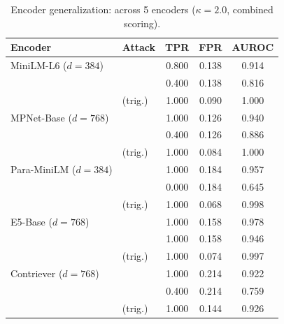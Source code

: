\begin{table}[h]
  \centering
  \small
  \caption{Encoder generalization: \memsad{} across 5 encoders ($\kappa = 2.0$, combined scoring).}
  \label{tab:encoder_gen}
  \begin{tabular}{llccc}
    \toprule
    Encoder & Attack & TPR & FPR & AUROC \\
    \midrule
    MiniLM-L6 ($d{=}384$) & \minja{} & 0.800 & 0.138 & 0.914 \\
     & \injecmem{} & 0.400 & 0.138 & 0.816 \\
     & \agentpoison{} (trig.) & 1.000 & 0.090 & 1.000 \\
    \midrule
    MPNet-Base ($d{=}768$) & \minja{} & 1.000 & 0.126 & 0.940 \\
     & \injecmem{} & 0.400 & 0.126 & 0.886 \\
     & \agentpoison{} (trig.) & 1.000 & 0.084 & 1.000 \\
    \midrule
    Para-MiniLM ($d{=}384$) & \minja{} & 1.000 & 0.184 & 0.957 \\
     & \injecmem{} & 0.000 & 0.184 & 0.645 \\
     & \agentpoison{} (trig.) & 1.000 & 0.068 & 0.998 \\
    \midrule
    E5-Base ($d{=}768$) & \minja{} & 1.000 & 0.158 & 0.978 \\
     & \injecmem{} & 1.000 & 0.158 & 0.946 \\
     & \agentpoison{} (trig.) & 1.000 & 0.074 & 0.997 \\
    \midrule
    Contriever ($d{=}768$) & \minja{} & 1.000 & 0.214 & 0.922 \\
     & \injecmem{} & 0.400 & 0.214 & 0.759 \\
     & \agentpoison{} (trig.) & 1.000 & 0.144 & 0.926 \\
    \bottomrule
  \end{tabular}
\end{table}
